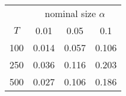 % 
\begin{tabular}{cccc}
  \hline
  & \multicolumn{3}{c}{nominal size $\alpha$} \\
 $T$ & 0.01 & 0.05 & 0.1 \\
 \hline
100 & 0.014 & 0.057 & 0.106 \\ 
  250 & 0.036 & 0.116 & 0.203 \\ 
  500 & 0.027 & 0.106 & 0.186 \\ 
   \hline
\end{tabular}

